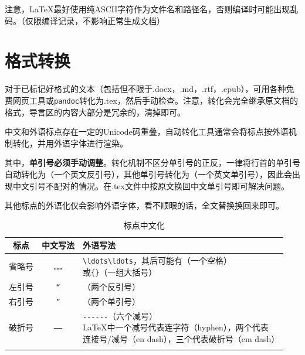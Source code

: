 \documentclass[10pt,openany]{book}
\begin{document}
\begin{sloppypar}
    注意，{\LaTeX}最好使用纯ASCII字符作为文件名和路径名，否则编译时可能出现乱码。（仅限编译记录，不影响正常生成文档）

    \section{格式转换}

    对于已标记好格式的文本（包括但不限于.docx，.md，.rtf，.epub），可用各种免费网页工具或\texttt{pandoc}转化为.tex，然后手动检查。注意，转化会完全继承原文档的格式，导言区的内容大部分是冗余的，清掉即可。

    中文和外语标点存在一定的Unicode码重叠，自动转化工具通常会将标点按外语机制转化，并用外语字体进行渲染。

    其中，\textbf{单引号必须手动调整}。转化机制不区分单引号的正反，一律将行首的单引号自动转化为\texttt{\textasciigrave{}}（一个英文反引号），其他单引号转化为\texttt{\textquotesingle{}}（一个英文单引号），因此会出现中文引号不配对的情况。在.tex文件中按原文换回中文单引号即可解决问题。

    其他标点的外语化仅会影响外语字体，看不顺眼的话，全文替换换回来即可。

    \begin{center}
        \begin{longtable}{ccl}
            \textbf{标点} & \textbf{中文写法} & \textbf{外语写法}                                                                                       \\
            \hline
            \endfirsthead
            省略号         & \texttt{……}   & \makecell[l]{\texttt{\textbackslash{}ldots\textbackslash{}ldots}，其后可能有\texttt{}（一个空格）               \\或\texttt{\{\}}（一组大括号）} \\
            \hline
            左引号         & \texttt{“}    & \texttt{\textasciigrave{}\textasciigrave{}}（两个反引号）                                                  \\
            \hline
            右引号         & \texttt{”}    & \texttt{\textquotesingle{}\textquotesingle{}}（两个单引号）                                                \\
            \hline
            破折号         & \texttt{——}   & \makecell[l]{\texttt{-\/-\/-\/-\/-\/-}（六个减号）\\{\LaTeX}中一个减号代表连字符（hyphen），两个代表 \\连接号/减号（en dash），三个代表破折号（em dash）}                                            \\
            \hline
            \caption{标点中文化}
        \end{longtable}
    \end{center}


\end{sloppypar}
\end{document}
